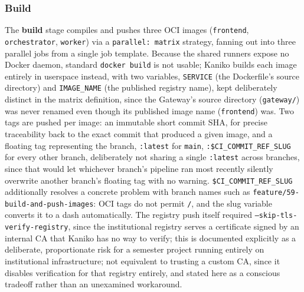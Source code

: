 \documentclass[twoside]{supsistudent}
\begin{document}
\subsubsection{Build}
The \textbf{build} stage compiles and pushes three OCI images (\texttt{frontend}, \texttt{orchestrator}, \texttt{worker}) via a \texttt{parallel: matrix} strategy, fanning out into three parallel jobs from a single job template. Because the shared runners expose no Docker daemon, standard \texttt{docker build} is not usable; Kaniko builds each image entirely in userspace instead, with two variables, \texttt{SERVICE} (the Dockerfile's source directory) and \texttt{IMAGE\_NAME} (the published registry name), kept deliberately distinct in the matrix definition, since the Gateway's source directory (\texttt{gateway/}) was never renamed even though its published image name (\texttt{frontend}) was. Two tags are pushed per image: an immutable short commit SHA, for precise traceability back to the exact commit that produced a given image, and a floating tag representing the branch, \texttt{:latest} for \texttt{main}, \texttt{:\$CI\_COMMIT\_REF\_SLUG} for every other branch, deliberately not sharing a single \texttt{:latest} across branches, since that would let whichever branch's pipeline ran most recently silently overwrite another branch's floating tag with no warning. \texttt{\$CI\_COMMIT\_REF\_SLUG} additionally resolves a concrete problem with branch names such as \texttt{feature/59-build-and-push-images}: OCI tags do not permit \texttt{/}, and the slug variable converts it to a dash automatically. The registry push itself required \texttt{--skip-tls-verify-registry}, since the institutional registry serves a certificate signed by an internal CA that Kaniko has no way to verify; this is documented explicitly as a deliberate, proportionate risk for a semester project running entirely on institutional infrastructure; not equivalent to trusting a custom CA, since it disables verification for that registry entirely, and stated here as a conscious tradeoff rather than an unexamined workaround.
\end{document}
